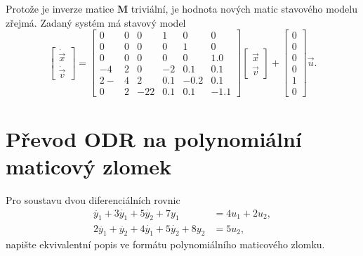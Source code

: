 \documentclass[twoside]{article}
\begin{document}
Protože je inverze matice $\mathbf{M}$ triviální,
je hodnota nových matic stavového modelu zřejmá. Zadaný systém má stavový model
\begin{equation}
	\begin{bmatrix}
		\dot{\vec{x}} \\ \dot{\vec{v}}
	\end{bmatrix} = \begin{bmatrix}
		0    &     0 &        0 &   1 &        0 &        0 \\
		0    &     0 &        0 &        0 &   1 &        0 \\
		0    &     0 &        0 &        0 &        0 &   1.0 \\
  -4    &2 &        0 &  -2 &   0.1 &   0.1 \\
   2   -&4 &   2 &   0.1 &  -0.2 &   0.1 \\
		0    &2 & -22 &   0.1 &   0.1 &  -1.1 
	\end{bmatrix} 	\begin{bmatrix}
		\vec{x} \\ \vec{v}
	\end{bmatrix} + \begin{bmatrix}
		0\\0\\0\\0\\1\\0
	\end{bmatrix} \vec{u}.
\end{equation}

\section{Převod ODR na polynomiální maticový zlomek}
Pro soustavu dvou diferenciálních rovnic
\begin{equation}
	\begin{split}
			\ddot{y_1} + 3 \dot{y_1} + 5 \dot{y_2} + 7 y_1 &= 4 u_1 + 2 u_2, \\
			2 \ddot{y_1} + \ddot{y_2} + 4 \dot{y_1} +5 \dot{y_2} +8 y_2 &= 5 u_2,
	\end{split}
\end{equation}
napište ekvivalentní popis ve formátu polynomiálního maticového zlomku.
\end{document}
